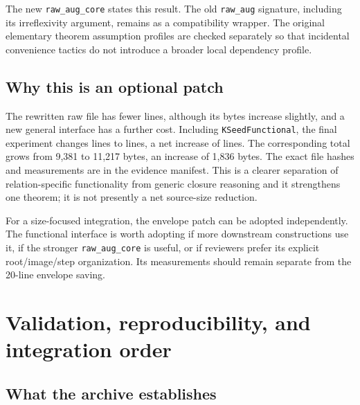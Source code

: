\documentclass[11pt,letterpaper]{article}
\theoremstyle{definition}\newtheorem{definition}[theorem]{Definition}
\theoremstyle{remark}\newtheorem{remark}[theorem]{Remark}
\newcommand{\code}[1]{\texttt{\small #1}}
\begin{document}
The new \code{raw\_aug\_core} states this result. The old \code{raw\_aug} signature, including its irreflexivity argument, remains as a compatibility wrapper. The original elementary theorem assumption profiles are checked separately so that incidental convenience tactics do not introduce a broader local dependency profile.

\subsection{Why this is an optional patch}

The rewritten raw file has fewer lines, although its bytes increase slightly, and a new general interface has a further cost. Including \code{KSeedFunctional}, the final experiment changes \SeedBeforeLines{} lines to \SeedAfterLines{} lines, a net increase of \SeedAddedLines{} lines. The corresponding total grows from 9,381 to 11,217 bytes, an increase of 1,836 bytes. The exact file hashes and measurements are in the evidence manifest. This is a clearer separation of relation-specific functionality from generic closure reasoning and it strengthens one theorem; it is not presently a net source-size reduction.

For a size-focused integration, the envelope patch can be adopted independently. The functional interface is worth adopting if more downstream constructions use it, if the stronger \code{raw\_aug\_core} is useful, or if reviewers prefer its explicit root/image/step organization. Its measurements should remain separate from the 20-line envelope saving.

\section{Validation, reproducibility, and integration order}

\subsection{What the archive establishes}
\end{document}
